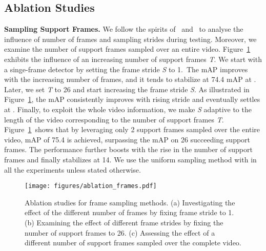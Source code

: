 \documentclass[10pt,twocolumn,letterpaper]{article}
\begin{document}
\subsection{Ablation Studies}
\noindent \textbf{ Sampling Support Frames.} We follow the spirits of~\cite{wu2019sequence} and~\cite{gong2021temporal} to analyse the influence of number of frames and sampling strides during testing. Moreover, we examine the number of support frames sampled over an entire video. Figure~\ref{fig:frame_sampling}\color{red}{(a)} \color{black} exhibits the influence of an increasing number of support frames \textit{T}. We start with a singe-frame detector by setting the frame stride \textit{S} to 1.~The mAP improves with the increasing number of frames, and it tends to stabilize at 74.4 mAP at . Later, we set \textit{T} to 26 and start increasing the frame stride \textit{S}. As illustrated in Figure~\ref{fig:frame_sampling}\color{red}{(b)}\color{black}, the mAP consistently improves with rising stride and eventually settles at . Finally, to exploit the whole video information, we make \textit{S} adaptive to the length of the video corresponding to the number of support frames \textit{T}. Figure~\ref{fig:frame_sampling}\color{red}{(c)}\color{black}~shows that by leveraging only 2 support frames sampled over the entire video, mAP of 75.4 is achieved, surpassing the mAP on 26 succeeding support frames. The performance further boosts with the rise in the number of support frames and finally stabilizes at 14. We use the uniform sampling method with  in all the experiments unless stated otherwise.

\begin{figure}
\begin{center}
\texttt{[image: figures/ablation\_frames.pdf]}
\caption{Ablation studies for frame sampling methods. (a) Investigating the effect of the different number of frames by fixing frame stride to 1. (b) Examining the effect of different frame strides by fixing the number of support frames to 26. (c) Assessing the effect of a different number of support frames sampled over the complete video.}
\label{fig:frame_sampling}
\end{center}
\vspace{-20pt}
\end{figure}
\end{document}

